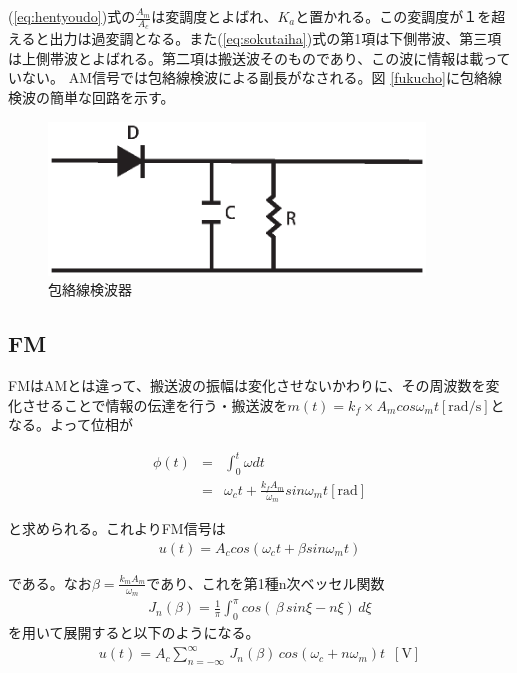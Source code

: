 \documentclass[11pt,a4j]{jsarticle}
\begin{document}
(\ref{eq:hentyoudo})式の$\frac{A_m}{A_c}$は変調度とよばれ、$K_a$と置かれる。この変調度が１を超えると出力は過変調となる。また(\ref{eq:sokutaiha})式の第1項は下側帯波、第三項は上側帯波とよばれる。第二項は搬送波そのものであり、この波に情報は載っていない。
AM信号では包絡線検波による副長がなされる。図 \ref{fukucho}に包絡線検波の簡単な回路を示す。
\begin{figure}[H]
\begin{center}
	\includegraphics[clip, width=100mm]{am_fukucho.eps}
	\caption{包絡線検波器}
	\label{fig:amdemo}
\end{center}
\end{figure}

\subsection{FM}
FMはAMとは違って、搬送波の振幅は変化させないかわりに、その周波数を変化させることで情報の伝達を行う・搬送波を$m(t)=k_f\times A_mcos\omega_mt\mathrm{[rad / s]}$となる。よって位相が

\begin{eqnarray*}
\phi (t) &=&\int_0^t \omega dt\\
           &=& \omega_c t + \frac{k_fA_m}{\omega_m}sin\omega_mt\mathrm{[rad]}
\end{eqnarray*}

と求められる。これよりFM信号は
\begin{eqnarray*}
u(t) = A_ccos(\omega_c t + \beta sin\omega_m t)
\end{eqnarray*}

\hspace{5mm}

である。なお$\beta = \frac{\displaystyle k_mA_m}{\displaystyle \omega_m}$であり、これを第1種n次ベッセル関数
\begin{align*}
  J_n(\beta) = \frac{1}{\pi}\int_0^{\pi}cos(\, \beta \, sin \xi - n \xi ) \, d \xi
\end{align*}
を用いて展開すると以下のようになる。
\begin{eqnarray}
u(t) = A_c \sum_{n = - \infty}^{\infty} \, J_n(\beta) \, cos(\omega_c + n\omega_m)t \,\,\, \mathrm{[V]}
\label{eq:fm}
\end{eqnarray}
\end{document}
